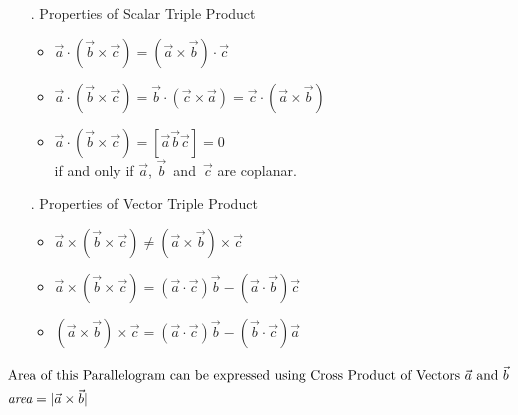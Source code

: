 \documentclass{article}
\begin{document}
\begin{multicols}{2}
    \begin{flushleft}
        \begin{enumerate}
            \item[.] Properties of Scalar Triple Product
                \begin{itemize}
                \item $\vec{a} \cdot (\vec{b} \times \vec{c}) = (\vec{a} \times \vec{b}) \cdot \vec{c}$
                \item $\vec{a} \cdot (\vec{b} \times \vec{c}) = \vec{b} \cdot (\vec{c} \times \vec{a}) = \vec{c} \cdot (\vec{a} \times \vec{b})$
                \item $\vec{a} \cdot (\vec{b} \times \vec{c}) = [\vec{a} \vec{b} \vec{c}] = 0$ \\if and only if $\vec{a}$, $\vec{b}$~and~$\vec{c}$ are coplanar.
                \end{itemize}
        \end{enumerate}
    \end{flushleft}
    \begin{flushright}
        \begin{enumerate}
            \item[.] Properties of Vector Triple Product
                \begin{itemize}
                \item $\vec{a} \times (\vec{b} \times \vec{c}) \neq (\vec{a} \times \vec{b}) \times \vec{c}$
                \item $\vec{a} \times (\vec{b} \times \vec{c}) = (\vec{a} \cdot \vec{c}) \vec{b} - (\vec{a} \cdot \vec{b})  \vec{c}$
                \item $(\vec{a} \times \vec{b}) \times \vec{c} = (\vec{a} \cdot \vec{c})\vec{b}-(\vec{b} \cdot \vec{c})\vec{a}$
                \end{itemize}
        \end{enumerate}
    \end{flushright}
\end{multicols}

\begin{multicols}{2}
    \begin{flushleft}
        \begin{align*}
            \intertext{Area of this Parallelogram can be expressed using Cross Product of Vectors $\vec{a}$ and $\vec{b}$}
            \textit{area} &= | \vec{a} \times \vec{b} |
        \end{align*}
    \end{flushleft}
    \begin{flushright}
    \end{flushright}
\end{multicols}
\end{document}
